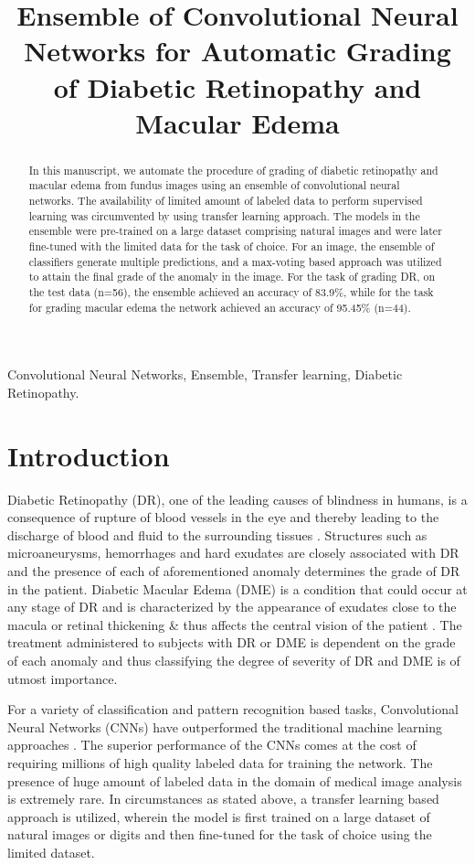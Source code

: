\documentclass{paper}
\title{Ensemble of Convolutional Neural Networks for Automatic Grading of Diabetic Retinopathy and Macular Edema}
\begin{document}
%
\maketitle
%
\begin{abstract}

In this manuscript, we automate the procedure of grading of diabetic retinopathy and macular edema from fundus images using an ensemble of convolutional neural networks. The availability of limited amount of labeled data to perform supervised learning was circumvented by using transfer learning approach. The models in the ensemble were pre-trained on a large dataset comprising natural images and were later fine-tuned with the limited data for the task of choice. For an image, the ensemble of classifiers generate multiple predictions, and a max-voting based approach was utilized to attain the final grade of the anomaly in the image. For the task of grading DR, on the test data (n=56), the ensemble achieved an accuracy of 83.9\%, while for the task for grading macular edema the network achieved an accuracy of 95.45\% (n=44). 

\end{abstract}
%
\begin{keywords}
Convolutional Neural Networks, Ensemble, Transfer learning, Diabetic Retinopathy.
\end{keywords}
%
\section{Introduction}
\label{sec:intro}

Diabetic Retinopathy (DR), one of the leading causes of blindness in humans, is a consequence of rupture of blood vessels in the eye and thereby leading to the discharge of blood and fluid to the surrounding tissues \cite{carrera2017automated}. Structures such as microaneurysms, hemorrhages and hard exudates are closely associated with DR and the presence of each of aforementioned anomaly determines the grade of DR in the patient. Diabetic Macular Edema (DME) is a condition that could occur at any stage of DR and is  characterized by the appearance of exudates close to the macula or retinal thickening \& thus affects the central vision of the patient \cite{al2016diabetic}. The treatment administered to subjects with DR or DME is dependent on the grade of each anomaly and thus classifying the degree of severity of DR and DME is of utmost importance. 

\par For a variety of classification and pattern recognition based tasks, Convolutional Neural Networks (CNNs) have outperformed the traditional machine learning approaches \cite{alexnet}. The superior performance of the CNNs comes at the cost of requiring millions of high quality labeled data for training the network. The presence of huge amount of labeled data in the domain of medical image analysis is extremely rare. In circumstances as stated above, a transfer learning based approach is utilized, wherein the model is first trained on a large dataset of natural images or digits and then fine-tuned for the task of choice using the limited dataset. 
\end{document}
